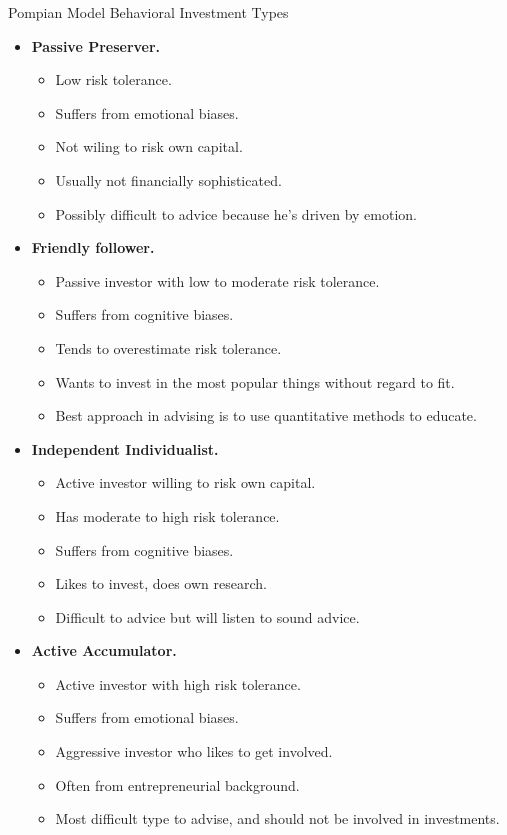 \documentclass[../custom]{flashcards}
\newcommand{\studyArea}{Behavioral Finance}
\begin{document}
\begin{flashcard}[\studyArea]{Pompian Model Behavioral Investment Types}
    \begin{itemize}[nosep]
        \item \textbf{Passive Preserver.}
            \begin{itemize}[nosep]
                \item Low risk tolerance.
                \item Suffers from emotional biases.
                \item Not wiling to risk own capital.
                \item Usually not financially sophisticated.
                \item Possibly difficult to advice because he's driven by emotion.
            \end{itemize}
        \item \textbf{Friendly follower.}
            \begin{itemize}[nosep]
                \item Passive investor with low to moderate risk tolerance.
                \item Suffers from cognitive biases.
                \item Tends to overestimate risk tolerance.
                \item Wants to invest in the most popular things without regard to fit.
                \item Best approach in advising is to use quantitative methods to educate.
            \end{itemize}
        \item \textbf{Independent Individualist.}
            \begin{itemize}[nosep]
                \item Active investor willing to risk own capital.
                \item Has moderate to high risk tolerance.
                \item Suffers from cognitive biases.
                \item Likes to invest, does own research.
                \item Difficult to advice but will listen to sound advice.
            \end{itemize}
        \item \textbf{Active Accumulator.}
            \begin{itemize}[nosep]
                \item Active investor with high risk tolerance.
                \item Suffers from emotional biases. 
                \item Aggressive investor who likes to get involved.
                \item Often from entrepreneurial background.
                \item Most difficult type to advise, and should not be involved in investments.
            \end{itemize}
    \end{itemize}
\end{flashcard}
\end{document}
